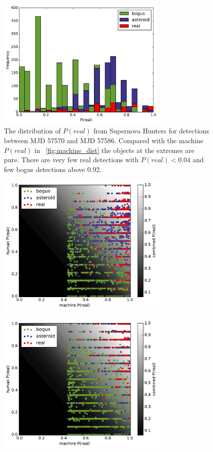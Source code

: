 \documentclass[a4paper,fleqn,usenatbib]{mnras}
\begin{document}
\begin{figure}
   \includegraphics[width=84mm]{figs/human_hist.pdf}
   \caption{The distribution of $P(real)$ from Supernova Hunters for detections between 
            MJD 57570 and MJD 57586.  Compared with the machine $P(real)$ in ~\ref{fig:machine_dist}
            the objects at the extremes are pure.  There are very few real detections with 
            $P(real) < 0.04$ and few bogus detections above 0.92.} 
   \label{fig:human_dist} 
\end{figure}

\begin{figure}
   \includegraphics[width=84mm]{figs/human_v_machine_train.pdf}
   \caption{} 
   \label{fig:combo_train} 
\end{figure}

\begin{figure}
   \includegraphics[width=84mm]{figs/human_v_machine_test.pdf}
   \caption{} 
   \label{fig:combo_test} 
\end{figure}
\end{document}
